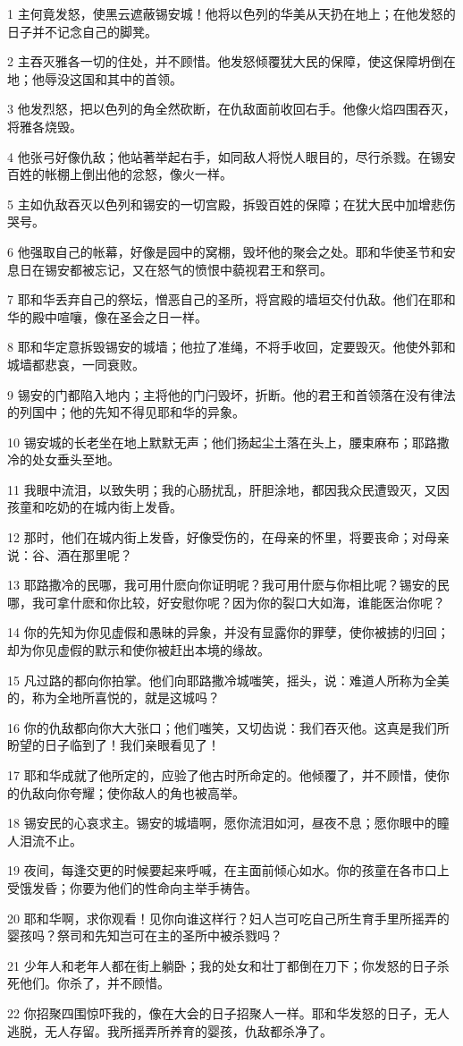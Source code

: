 \par 1 主何竟发怒，使黑云遮蔽锡安城！他将以色列的华美从天扔在地上；在他发怒的日子并不记念自己的脚凳。
\par 2 主吞灭雅各一切的住处，并不顾惜。他发怒倾覆犹大民的保障，使这保障坍倒在地；他辱没这国和其中的首领。
\par 3 他发烈怒，把以色列的角全然砍断，在仇敌面前收回右手。他像火焰四围吞灭，将雅各烧毁。
\par 4 他张弓好像仇敌；他站著举起右手，如同敌人将悦人眼目的，尽行杀戮。在锡安百姓的帐棚上倒出他的忿怒，像火一样。
\par 5 主如仇敌吞灭以色列和锡安的一切宫殿，拆毁百姓的保障；在犹大民中加增悲伤哭号。
\par 6 他强取自己的帐幕，好像是园中的窝棚，毁坏他的聚会之处。耶和华使圣节和安息日在锡安都被忘记，又在怒气的愤恨中藐视君王和祭司。
\par 7 耶和华丢弃自己的祭坛，憎恶自己的圣所，将宫殿的墙垣交付仇敌。他们在耶和华的殿中喧嚷，像在圣会之日一样。
\par 8 耶和华定意拆毁锡安的城墙；他拉了准绳，不将手收回，定要毁灭。他使外郭和城墙都悲哀，一同衰败。
\par 9 锡安的门都陷入地内；主将他的门闩毁坏，折断。他的君王和首领落在没有律法的列国中；他的先知不得见耶和华的异象。
\par 10 锡安城的长老坐在地上默默无声；他们扬起尘土落在头上，腰束麻布；耶路撒冷的处女垂头至地。
\par 11 我眼中流泪，以致失明；我的心肠扰乱，肝胆涂地，都因我众民遭毁灭，又因孩童和吃奶的在城内街上发昏。
\par 12 那时，他们在城内街上发昏，好像受伤的，在母亲的怀里，将要丧命；对母亲说：谷、酒在那里呢？
\par 13 耶路撒冷的民哪，我可用什麽向你证明呢？我可用什麽与你相比呢？锡安的民哪，我可拿什麽和你比较，好安慰你呢？因为你的裂口大如海，谁能医治你呢？
\par 14 你的先知为你见虚假和愚昧的异象，并没有显露你的罪孽，使你被掳的归回；却为你见虚假的默示和使你被赶出本境的缘故。
\par 15 凡过路的都向你拍掌。他们向耶路撒冷城嗤笑，摇头，说：难道人所称为全美的，称为全地所喜悦的，就是这城吗？
\par 16 你的仇敌都向你大大张口；他们嗤笑，又切齿说：我们吞灭他。这真是我们所盼望的日子临到了！我们亲眼看见了！
\par 17 耶和华成就了他所定的，应验了他古时所命定的。他倾覆了，并不顾惜，使你的仇敌向你夸耀；使你敌人的角也被高举。
\par 18 锡安民的心哀求主。锡安的城墙啊，愿你流泪如河，昼夜不息；愿你眼中的瞳人泪流不止。
\par 19 夜间，每逢交更的时候要起来呼喊，在主面前倾心如水。你的孩童在各市口上受饿发昏；你要为他们的性命向主举手祷告。
\par 20 耶和华啊，求你观看！见你向谁这样行？妇人岂可吃自己所生育手里所摇弄的婴孩吗？祭司和先知岂可在主的圣所中被杀戮吗？
\par 21 少年人和老年人都在街上躺卧；我的处女和壮丁都倒在刀下；你发怒的日子杀死他们。你杀了，并不顾惜。
\par 22 你招聚四围惊吓我的，像在大会的日子招聚人一样。耶和华发怒的日子，无人逃脱，无人存留。我所摇弄所养育的婴孩，仇敌都杀净了。

